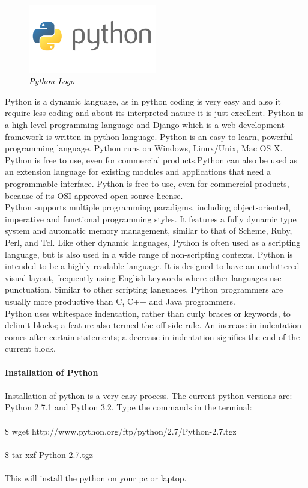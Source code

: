 \begin{figure}[!ht]
\centering
\includegraphics[width=0.5\textwidth]{images/python.png}                   
\vspace{-1em}
\caption{\textcolor{black}{\footnotesize \textit{Python Logo}}}
\hspace{-1.5em}
\end{figure}
\hspace{-1.9em} Python is a dynamic language, as in python coding is very easy and also it require less coding and about its interpreted nature it is just excellent. Python is a high level programming language and Django which is a web development framework is written in python language. Python is an easy to learn, powerful programming language. Python runs on Windows, Linux/Unix, Mac OS X. Python is free to use, even for commercial products.Python can also be used as an extension language for existing modules and applications that need a programmable interface. Python is free to use, even for commercial products, because of its OSI-approved open source license.\\
Python supports multiple programming paradigms, including object-oriented, imperative and functional programming styles. It features a fully dynamic type system and automatic memory management, similar to that of Scheme, Ruby, Perl, and Tcl. Like other dynamic languages, Python is often used as a scripting language, but is also used in a wide range of non-scripting contexts. Python is intended to be a highly readable language. It is designed to have an uncluttered visual layout, frequently using English keywords where other languages use punctuation. Similar to other scripting languages, Python programmers are usually more productive than 
C, C++ and Java programmers.\\
Python uses whitespace indentation, rather than curly braces or keywords, to delimit blocks; a feature also termed the off-side rule. An increase in indentation comes after certain statements; a decrease in indentation 
signifies the end of the current block.\\\\
{\bf Installation of Python}\\\\
Installation of python is a very easy process.
The current python versions are: Python 2.7.1 and Python 3.2.
Type the commands in the terminal:\\\\
\$ wget http://www.python.org/ftp/python/2.7/Python-2.7.tgz\\\\
\$ tar xzf Python-2.7.tgz\\\\
This will install the python on your pc or laptop.

